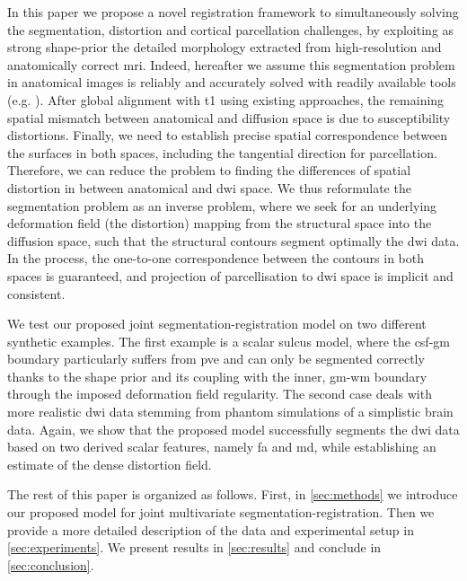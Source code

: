 In this paper we propose a novel registration framework to simultaneously
solving the segmentation, distortion and cortical parcellation challenges, 
by exploiting as strong shape-prior the detailed morphology extracted 
from high-resolution and anatomically correct \gls{mri}. Indeed, hereafter 
we assume this segmentation problem in anatomical images is reliably and
accurately solved with readily available tools (e.g. \citep{fischl_freesurfer_2012}).
After global alignment with \gls{t1} using existing approaches, the remaining 
spatial mismatch between anatomical and diffusion space is due to susceptibility
distortions.
Finally, we need to establish precise spatial correspondence between the 
surfaces in both spaces, including the tangential direction for parcellation.
Therefore, we can reduce the problem to finding the differences of spatial 
distortion in between anatomical and \gls{dwi} space.
We thus reformulate the segmentation problem as an inverse problem, where we 
seek for an underlying deformation field (the distortion) mapping 
from the structural space into the diffusion space, such that the structural 
contours segment optimally the \gls{dwi} data. In the process, the one-to-one 
correspondence between the contours in both spaces is guaranteed, and projection 
of parcellisation to \gls{dwi} space is implicit and consistent.

We test our proposed joint segmentation-registration model on two different 
synthetic examples. The first example is a scalar sulcus model, where the 
\gls{csf}-\gls{gm} boundary particularly suffers from \gls{pve} and can only be 
segmented correctly thanks to the shape prior and its coupling with the inner, 
\gls{gm}-\gls{wm} boundary through the imposed deformation field regularity. 
The second case deals with more realistic \gls{dwi} data stemming from 
phantom simulations of a simplistic brain data. Again, we show that the 
proposed model successfully segments the \gls{dwi} data based on two derived 
scalar features, namely \gls{fa} and \gls{md}, while establishing an estimate 
of the dense distortion field.

The rest of this paper is organized as follows. First, in \autoref{sec:methods}
we introduce our proposed model for joint multivariate segmentation-registration.
Then we provide a more detailed description of the data and experimental setup in
\autoref{sec:experiments}. We present results in \autoref{sec:results} and conclude 
in \autoref{sec:conclusion}.